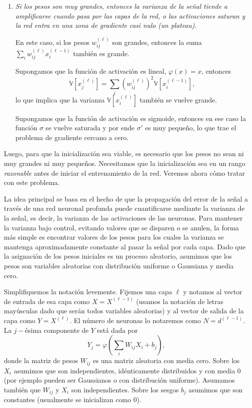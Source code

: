 \documentclass[12pt, a4paper]{amsbook}
\newcommand{\V}{{\mathbb V}}
\theoremstyle{remark}
\theoremstyle{definition}
\numberwithin{section}{chapter}
\numberwithin{subsection}{section}
\numberwithin{equation}{section}
\numberwithin{figure}{chapter}
\begin{document}
\begin{enumerate}
\bigskip

\item {\em Si los pesos son muy grandes, entonces la varianza de la señal tiende a amplificarse cuando pasa por las capas de la red, o las activaciones saturan y la red entra en una zona de gradiente casi nulo (un {\em plateau})}.

En este caso, si los pesos $w_{ij}^{(\ell)}$ son grandes, entonces la suma $\sum_i w_{ij}^{(\ell)} x_i^{(\ell-1)}$ también es grande.

Supongamos que la función de activación es lineal, $\varphi(x)=x$, entonces
$$
\V[x_j^{(\ell)}] = \sum_i \left(w_{ij}^{(\ell)}\right)^2 \V[x_i^{(\ell-1)}],
$$
lo que implica que la varianza $\V[x_i^{(\ell)}]$ también se vuelve grande.

Supongamos que la función de activación es sigmoide, entonces en ese caso la función $\sigma$ se vuelve saturada y por ende $\sigma'$ es muy pequeño, lo que trae el problema de gradiente cercano a cero.
\end{enumerate}

Luego, para que la inicialización sea viable, es necesario que los pesos no sean ni muy grandes ni muy pequeños. Necesitamos que la inicialización sea en un rango {\em razonable} antes de iniciar el entrenamiento de la red. Veremos ahora cómo tratar con este problema.

La idea principal se basa en el hecho de que la propagación del error de la señal a través de una red neuronal profunda puede cuantificarse mediante la varianza de la señal, es decir, la varianza de las activaciones de las neuronas. Para mantener la varianza bajo control, evitando valores que se disparen o se anulen, la forma más simple es encontrar valores de los pesos para los cuales la varianza se mantenga aproximadamente constante al pasar la señal por cada capa. Dado que la asignación de los pesos iniciales es un proceso aleatorio, asumimos que los pesos son variables aleatorias con distribución uniforme o Gaussiana y media cero.

Simplifiquemos la notación levemente. Fijemos una capa $\ell$ y notamos al vector de entrada de esa capa como $X=X^{(\ell-1)}$ (usamos la notación de letras mayúsculas dado que serán todos variables aleatorias) y al vector de salida de la capa como $Y=X^{(\ell)}$. El número de neuronas lo notaremos como $N=d^{(\ell-1)}$. La $j-$ésima componente de $Y$ está dada por
$$
Y_j = \varphi\left(\sum_i W_{ij} X_i + b_j\right),
$$
donde la matriz de pesos $W_{ij}$ es una matriz aleatoria con media cero. Sobre los $X_i$ asumimos que son independientes, idénticamente distribuidos y con media 0 (por ejemplo pueden ser Gaussianos o con distribución uniforme). Asumamos también que $W_{ij}$ y $X_i$ son independientes. Sobre los sesgos $b_j$ asumimos que son constantes (usualmente se inicializan como 0). 
\end{document}
